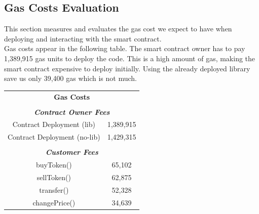 \documentclass[12pt,a4paper]{article}
\begin{document}
\subsection*{Gas Costs Evaluation}
This section measures and evaluates the gas cost we expect to have when deploying and
interacting with the smart contract. \\

Gas costs appear in the following table. The smart contract owner has to pay
1,389,915 gas units to deploy the code. This is a high amount of gas, making the
smart contract expensive to deploy initially. Using the already deployed library
save us only 39,400 gas which is not much. \\

\begin{table}[htpb]
    \begin{center}
        \begin{tabular}{cc}
        \multicolumn{2}{c}{\textbf{Gas Costs}}                                                                \\
        \multicolumn{1}{l}{}                                                & \multicolumn{1}{l}{}            \\ \hline
        \multicolumn{2}{|c|}{\textit{\textbf{Contract Owner Fees}}}                                           \\ \hline
        \multicolumn{1}{|c|}{Contract Deployment (lib)}                     & \multicolumn{1}{c|}{1,389,915}  \\ \hline
        \multicolumn{1}{|c|}{Contract Deployment (no-lib) }                 & \multicolumn{1}{c|}{1,429,315}  \\ \hline
        \multicolumn{1}{l}{}                                                & \multicolumn{1}{l}{}            \\ \hline
        \multicolumn{2}{|c|}{\textit{\textbf{Customer Fees}}}                                                 \\ \hline
        \multicolumn{1}{|c|}{buyToken()}                                   & \multicolumn{1}{c|}{65,102}   \\ \hline
        \multicolumn{1}{|c|}{sellToken()}                                  & \multicolumn{1}{c|}{62,875}   \\ \hline
        \multicolumn{1}{|c|}{transfer()}                                   & \multicolumn{1}{c|}{52,328}   \\ \hline
        \multicolumn{1}{|c|}{changePrice()}                                & \multicolumn{1}{c|}{34,639}   \\ \hline

\end{tabular}
\end{center}
\end{table}
\end{document}
